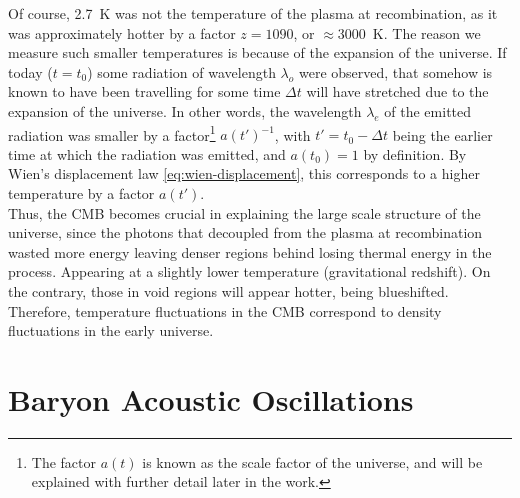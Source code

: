 Of course, \SI{2.7}{K} was not the temperature of the plasma at recombination, as it was approximately hotter by a factor $z=1090$, or $\approx$\SI{3000}{K}. The reason we measure such smaller temperatures is because of the expansion of the universe.
If today ($t=t_0$) some radiation of wavelength $\lambda_o$ were observed, that somehow is known to have been travelling for some time $\Delta t$ will have stretched due to the expansion of the universe. In other words, the wavelength $\lambda_e$ of the emitted radiation was smaller by a factor\footnote{The factor $a(t)$ is known as the scale factor of the universe, and will be explained with further detail later in the work.} $a(t')^{-1}$, with $t' = t_0-\Delta t$ being the earlier time at which the radiation was emitted, and $a(t_0)=1$ by definition. By Wien's displacement law \eqref{eq:wien-displacement}, this corresponds to a higher temperature by a factor $a(t')$. \\


Thus, the CMB becomes crucial in explaining the large scale structure of the universe, since the photons that decoupled from the plasma at recombination wasted more energy leaving denser regions behind losing thermal energy in the process. Appearing at a slightly lower temperature (gravitational redshift). On the contrary, those in void regions will appear hotter, being blueshifted. Therefore, temperature fluctuations in the CMB correspond to density fluctuations in the early universe. \\

\section{Baryon Acoustic Oscillations}
\label{sec:BAO}

